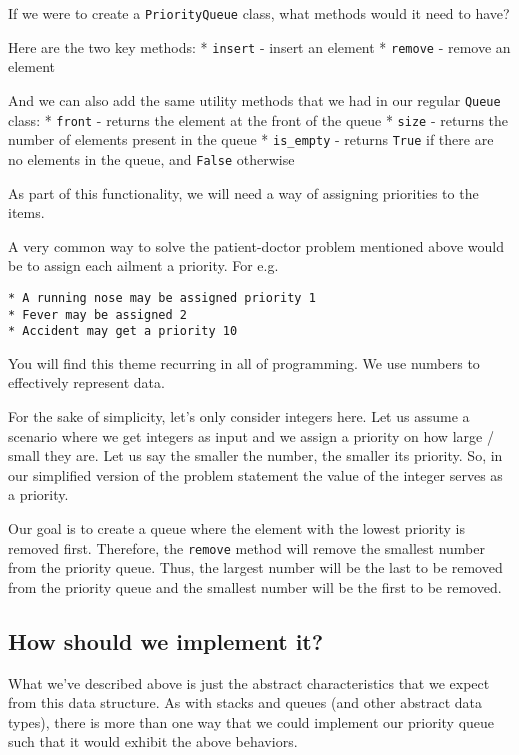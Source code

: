 \documentclass[11pt]{article}
\begin{document}
If we were to create a \texttt{PriorityQueue} class, what methods would
it need to have?

Here are the two key methods: * \texttt{insert} - insert an element *
\texttt{remove} - remove an element

And we can also add the same utility methods that we had in our regular
\texttt{Queue} class: * \texttt{front} - returns the element at the
front of the queue * \texttt{size} - returns the number of elements
present in the queue * \texttt{is\_empty} - returns \texttt{True} if
there are no elements in the queue, and \texttt{False} otherwise

As part of this functionality, we will need a way of assigning
priorities to the items.

A very common way to solve the patient-doctor problem mentioned above
would be to assign each ailment a priority. For e.g.

\begin{verbatim}
* A running nose may be assigned priority 1
* Fever may be assigned 2
* Accident may get a priority 10
\end{verbatim}

You will find this theme recurring in all of programming. We use numbers
to effectively represent data.

For the sake of simplicity, let's only consider integers here. Let us
assume a scenario where we get integers as input and we assign a
priority on how large / small they are. Let us say the smaller the
number, the smaller its priority. So, in our simplified version of the
problem statement the value of the integer serves as a priority.

Our goal is to create a queue where the element with the lowest priority
is removed first. Therefore, the \texttt{remove} method will remove the
smallest number from the priority queue. Thus, the largest number will
be the last to be removed from the priority queue and the smallest
number will be the first to be removed.

\subsection{How should we implement
it?}\label{how-should-we-implement-it}

What we've described above is just the abstract characteristics that we
expect from this data structure. As with stacks and queues (and other
abstract data types), there is more than one way that we could implement
our priority queue such that it would exhibit the above behaviors.
\end{document}
